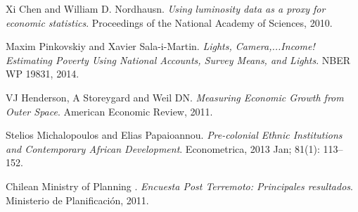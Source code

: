 \documentclass[12pt,fleqn,leqno,letterpaper]{article}
\begin{document}
\begin{thebibliography}{9}
	Xi Chen and William D. Nordhausn. 
	\textit{Using luminosity data as a proxy for economic statistics}. 
	Proceedings of the National Academy of Sciences, 2010.

	Maxim Pinkovskiy and Xavier Sala-i-Martin. 
	\textit{Lights, Camera,...Income! Estimating Poverty Using National Accounts, Survey Means, and Lights}. 
	NBER WP 19831, 2014.

	VJ Henderson, A Storeygard and Weil DN. 
	\textit{Measuring Economic Growth from Outer Space}. 
	American Economic Review, 2011.

	Stelios Michalopoulos and Elias Papaioannou. 
	\textit{Pre-colonial Ethnic Institutions and Contemporary African Development}. 
	Econometrica, 2013 Jan; 81(1): 113–152.

	Chilean Ministry of Planning . 
	\textit{Encuesta Post Terremoto: Principales resultados}. 
	Ministerio de Planificación, 2011.
\end{thebibliography}
\end{document}
